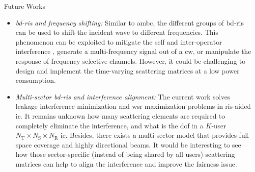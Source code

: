 \begin{section}{Future Works}
\begin{itemize}
		\item \emph{\gls{bd}-\gls{ris} and frequency shifting:} Similar to \gls{ambc}, the different groups of \gls{bd}-\gls{ris} can be used to shift the incident wave to different frequencies.
		This phenomenon can be exploited to mitigate the self and inter-operator interference \cite{Miridakis2024}, generate a multi-frequency signal out of a \gls{cw}, or manipulate the response of frequency-selective channels. However, it could be challenging to design and implement the time-varying scattering matrices at a low power consumption.
		\item \emph{Multi-sector \gls{bd}-\gls{ris} and interference alignment:} The current work solves leakage interference minimization and \gls{wsr} maximization problems in \gls{ris}-aided \gls{ic}.
		It remains unknown how many scattering elements are required to completely eliminate the interference, and what is the \gls{dof} in a $K$-user $N_\mathrm{T} \times N_\mathrm{S} \times N_\mathrm{R}$ \gls{ic}.
		Besides, there exists a multi-sector model \cite{Li2023c} that provides full-space coverage and highly directional beams.
		It would be interesting to see how those sector-specific (instead of being shared by all users) scattering matrices can help to align the interference and improve the fairness issue.
	\end{itemize}
\end{section}
